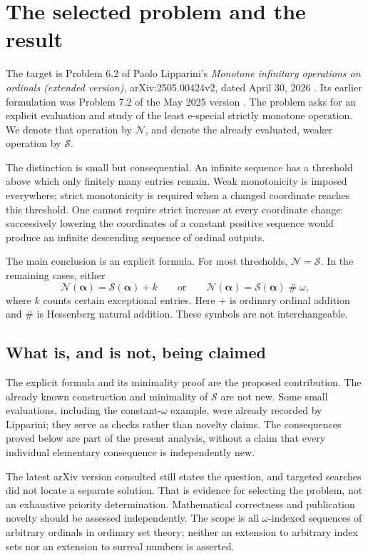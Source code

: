 \documentclass[11pt,letterpaper]{article}
\theoremstyle{definition}
\theoremstyle{remark}
\newcommand{\Nop}{\mathcal N}
\newcommand{\Sop}{\mathcal S}
\newcommand{\seq}[1]{\boldsymbol{#1}}
\newcommand{\ns}{\mathbin{\#}}
\begin{document}
\setcounter{tocdepth}{1}
\tableofcontents
\newpage

\section{The selected problem and the result}

The target is Problem 6.2 of Paolo Lipparini's \emph{Monotone infinitary operations on ordinals (extended version)}, arXiv:2505.00424v2, dated April 30, 2026 \cite{Lip26}. Its earlier formulation was Problem 7.2 of the May 2025 version \cite{Lip25}. The problem asks for an explicit evaluation and study of the least e-special strictly monotone operation. We denote that operation by $\Nop$, and denote the already evaluated, weaker operation by $\Sop$.

The distinction is small but consequential. An infinite sequence has a threshold above which only finitely many entries remain. Weak monotonicity is imposed everywhere; strict monotonicity is required when a changed coordinate reaches this threshold. One cannot require strict increase at every coordinate change: successively lowering the coordinates of a constant positive sequence would produce an infinite descending sequence of ordinal outputs.

The main conclusion is an explicit formula. For most thresholds, $\Nop=\Sop$. In the remaining cases, either
\[
 \Nop(\seq\alpha)=\Sop(\seq\alpha)+k
 \qquad\text{or}\qquad
 \Nop(\seq\alpha)=\Sop(\seq\alpha)\ns\omega,
\]
where $k$ counts certain exceptional entries. Here $+$ is ordinary ordinal addition and $\#$ is Hessenberg natural addition. These symbols are not interchangeable.

\subsection{What is, and is not, being claimed}

The explicit formula and its minimality proof are the proposed contribution. The already known construction and minimality of $\Sop$ are not new. Some small evaluations, including the constant-$\omega$ example, were already recorded by Lipparini; they serve as checks rather than novelty claims. The consequences proved below are part of the present analysis, without a claim that every individual elementary consequence is independently new.

The latest arXiv version consulted still states the question, and targeted searches did not locate a separate solution. That is evidence for selecting the problem, not an exhaustive priority determination. Mathematical correctness and publication novelty should be assessed independently. The scope is all $\omega$-indexed sequences of arbitrary ordinals in ordinary set theory; neither an extension to arbitrary index sets nor an extension to surreal numbers is asserted.
\end{document}
